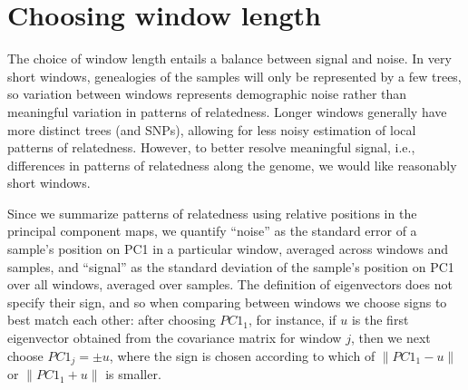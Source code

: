 \documentclass[11pt, oneside]{article}   	%
\newif\ifsubmission
\newcommand{\pcone}{PC1}
\renewcommand{\revpoint}[2]{\relax}
\renewcommand{\llabel}[1]{\relax}
\begin{document}
  
\ifsubmission
    \clearpage
    \newcounter{bibend}
    \setcounter{bibend}{\value{page}}
\fi

\ifsubmission\processdelayedfloats\fi

\ifsubmission
    \clearpage
    \setcounter{page}{\thebibend}
\fi

\appendix
\setcounter{table}{0}
\renewcommand{\thetable}{S\arabic{table}}
\setcounter{figure}{0}
\renewcommand{\thefigure}{S\arabic{figure}}
\ifsubmission
    \setcounter{postfigure}{0}
    \renewcommand{\thepostfigure}{S\arabic{postfigure}}
\fi

\section{Choosing window length}
\label{apx:window_length}

The choice of window length entails a balance between signal and noise.
In very short windows, genealogies of the samples will only be represented by a few trees,
so variation between windows represents demographic noise rather than meaningful variation in patterns of relatedness.
Longer windows generally have more distinct trees (and SNPs), 
allowing for less noisy estimation of local patterns of relatedness.
However, to better resolve meaningful signal, i.e., differences in patterns of relatedness along the genome,
we would like reasonably short windows.

Since we summarize patterns of relatedness using relative positions in the principal component maps,
we quantify ``noise'' as the standard error of a sample's position on PC1 in a particular window,
averaged across windows and samples,
and ``signal'' as the standard deviation of the sample's position on PC1 over all windows,
averaged over samples. %
The definition of eigenvectors does not specify their sign,
and so when comparing between windows we choose signs to best match each other:
after choosing $\pcone_1$, for instance, 
if $u$ is the first eigenvector obtained from the covariance matrix
for window $j$,
then we next choose $\pcone_j = \pm u$,
where the sign is chosen according to which of 
$\| \pcone_{1} - u \|$ or
$\| \pcone_{1} + u \|$ 
is smaller.
\llabel{ll:moved_pc_note}
\end{document}

